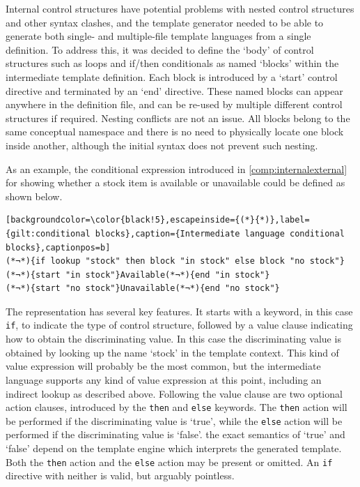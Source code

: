Internal control structures have potential problems with nested control structures and other syntax clashes, and the template generator needed to be able to generate both single- and multiple-file template languages from a single definition. To address this, it was decided to define the `body' of control structures such as loops and if/then conditionals as named `blocks' within the intermediate template definition. Each block is introduced by a `start' control directive and terminated by an `end' directive. These named blocks can appear anywhere in the definition file, and can be re-used by multiple different control structures if required. Nesting conflicts are not an issue. All blocks belong to the same conceptual namespace and there is no need to physically locate one block inside another, although the initial syntax does not prevent such nesting.

As an example, the conditional expression introduced in \autoref{comp:internalexternal} for showing whether a stock item is available or unavailable could be defined as shown below.

\begin{lstlisting}[backgroundcolor=\color{black!5},escapeinside={(*}{*)},label={gilt:conditional blocks},caption={Intermediate language conditional blocks},captionpos=b]
(*¬*){if lookup "stock" then block "in stock" else block "no stock"}
(*¬*){start "in stock"}Available(*¬*){end "in stock"}
(*¬*){start "no stock"}Unavailable(*¬*){end "no stock"}
\end{lstlisting}

The representation has several key features. It starts with a keyword, in this case \verb!if!, to indicate the type of control structure, followed by a value clause indicating how to obtain the discriminating value. In this case the discriminating value is obtained by looking up the name `stock' in the template context. This kind of value expression will probably be the most common, but the intermediate language supports any kind of value expression at this point, including an indirect lookup as described above. Following the value clause are two optional action clauses, introduced by the \verb!then! and \verb!else! keywords. The \verb!then! action will be performed if the discriminating value is `true', while the \verb!else! action will be performed if the discriminating value is `false'. the exact semantics of `true' and `false' depend on the template engine which interprets the generated template. Both the \verb!then! action and the \verb!else! action may be present or omitted. An \verb!if! directive with neither is valid, but arguably pointless.

